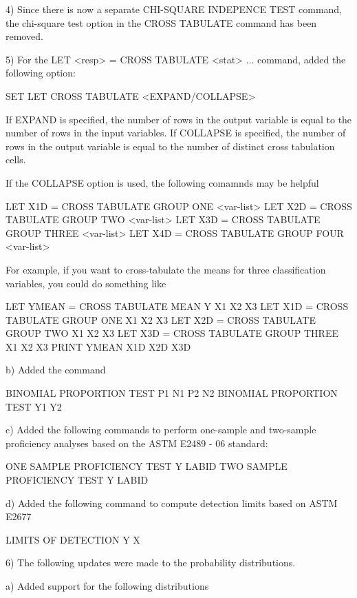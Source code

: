 {       4) Since there is now a separate CHI-SQUARE INDEPENCE TEST
          command, the chi-square test option in the CROSS TABULATE
          command has been removed.

       5) For the LET <resp> = CROSS TABULATE <stat> ...
          command, added the following option:

              SET LET CROSS TABULATE <EXPAND/COLLAPSE>

          If EXPAND is specified, the number of rows in the
          output variable is equal to the number of rows in
          the input variables.  If COLLAPSE is specified, the
          number of rows in the output variable is equal to the
          number of distinct cross tabulation cells.

          If the COLLAPSE option is used, the following comamnds
          may be helpful

             LET X1D = CROSS TABULATE GROUP ONE   <var-list>
             LET X2D = CROSS TABULATE GROUP TWO   <var-list>
             LET X3D = CROSS TABULATE GROUP THREE <var-list>
             LET X4D = CROSS TABULATE GROUP FOUR  <var-list>

         For example, if you want to cross-tabulate the means
         for three classification variables, you could do
         something like

              LET YMEAN = CROSS TABULATE MEAN Y X1 X2 X3
              LET X1D   = CROSS TABULATE GROUP ONE X1 X2 X3
              LET X2D   = CROSS TABULATE GROUP TWO X1 X2 X3
              LET X3D   = CROSS TABULATE GROUP THREE X1 X2 X3
              PRINT YMEAN X1D X2D X3D

    b) Added the command

          BINOMIAL PROPORTION TEST P1 N1 P2 N2
          BINOMIAL PROPORTION TEST Y1 Y2

    c) Added the following commands to perform one-sample and
       two-sample proficiency analyses based on the ASTM
       E2489 - 06 standard:

          ONE SAMPLE PROFICIENCY TEST Y LABID
          TWO SAMPLE PROFICIENCY TEST Y LABID

    d) Added the following command to compute detection limits
       based on ASTM E2677

          LIMITS OF DETECTION Y X

 6) The following updates were made to the probability
    distributions.

    a) Added support for the following distributions

}

